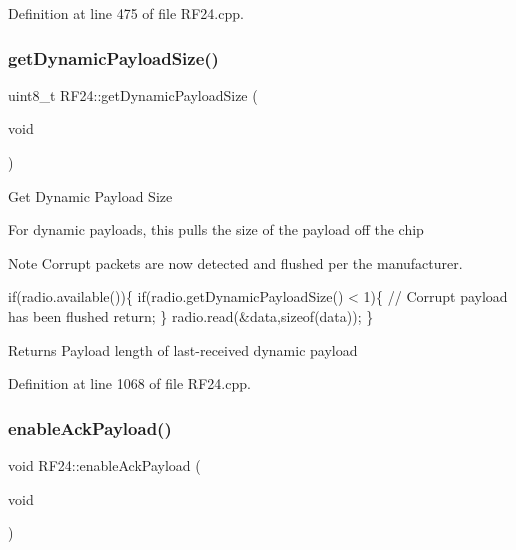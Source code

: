 Definition at line 475 of file R\+F24.\+cpp.

\mbox{\label{classRF24_a65963ed8d8fd45f847e2f673995b85e1}} 
\subsubsection{\texorpdfstring{get\+Dynamic\+Payload\+Size()}{getDynamicPayloadSize()}}
{\footnotesize\ttfamily uint8\+\_\+t R\+F24\+::get\+Dynamic\+Payload\+Size (\begin{DoxyParamCaption}\item[{void}]{ }\end{DoxyParamCaption})}

Get Dynamic Payload Size

For dynamic payloads, this pulls the size of the payload off the chip

\begin{DoxyNote}{Note}
Corrupt packets are now detected and flushed per the manufacturer. 
\begin{DoxyCode}
\textcolor{keywordflow}{if}(radio.available())\{
  \textcolor{keywordflow}{if}(radio.getDynamicPayloadSize() < 1)\{
    \textcolor{comment}{// Corrupt payload has been flushed}
    \textcolor{keywordflow}{return}; 
  \}
  radio.read(&data,\textcolor{keyword}{sizeof}(data));
\}
\end{DoxyCode}

\end{DoxyNote}
\begin{DoxyReturn}{Returns}
Payload length of last-\/received dynamic payload 
\end{DoxyReturn}


Definition at line 1068 of file R\+F24.\+cpp.

\mbox{\label{classRF24_abf8efced2ee9edbcc6510878b20edc1b}} 
\subsubsection{\texorpdfstring{enable\+Ack\+Payload()}{enableAckPayload()}}
{\footnotesize\ttfamily void R\+F24\+::enable\+Ack\+Payload (\begin{DoxyParamCaption}\item[{void}]{ }\end{DoxyParamCaption})}

